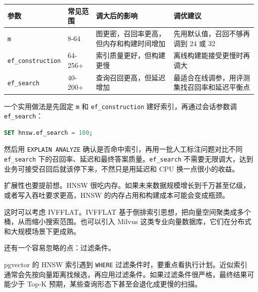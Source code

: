 \documentclass[9pt,a4paper,twocolumn]{ctexart}
\begin{document}
{\footnotesize
\begin{tabular}{|p{}|p{}|p{}|p{}|}
\hline
\textbf{参数} & \textbf{常见范围} & \textbf{调大后的影响} & \textbf{调优建议} \\
\hline
\texttt{m} & 8-64 & 图更密，召回率更高，但内存和构建时间增加 & 先用默认值，召回不够再调到 24 或 32 \\
\hline
\texttt{ef\_construction} & 64-256+ & 索引质量更好，但构建更慢 & 离线构建能接受更慢时再调大 \\
\hline
\texttt{ef\_search} & 40-200+ & 查询召回更高，但延迟增加 & 最适合在线调参，用评测集找召回率和延迟平衡点 \\
\hline
\end{tabular}
}



一个实用做法是先固定 \texttt{m} 和 \texttt{ef\_construction} 建好索引，再通过会话参数调 \texttt{ef\_search}：



\begin{lstlisting}[language=SQL]
SET hnsw.ef_search = 100;
\end{lstlisting}



然后用 \texttt{EXPLAIN ANALYZE} 确认是否命中索引，再用一批人工标注问题对比不同 \texttt{ef\_search} 下的召回率、延迟和最终答案质量。\texttt{ef\_search} 不需要无限调大，达到业务可接受召回后就该停下来，不然只是用延迟和 CPU 换一点很小的收益。



扩展性也要提前想。HNSW 很吃内存。如果未来数据规模增长到千万甚至亿级，或者写入吞吐要求更高，HNSW 的内存占用和构建成本可能会变成瓶颈。



这时可以考虑 IVFFLAT。IVFFLAT 基于倒排索引思想，把向量空间聚类成多个桶，从而缩小搜索范围。也可以引入 Milvus 这类专业向量数据库，它们在分布式和大规模场景下更成熟。



还有一个容易忽略的点：过滤条件。



pgvector 的 HNSW 索引遇到 \texttt{WHERE} 过滤条件时，要重点看执行计划。近似索引通常会先按向量距离找候选，再应用过滤条件。如果过滤条件很严格，最终结果可能少于 Top-K 预期，某些查询形态下甚至会退化成更慢的扫描。
\end{document}
